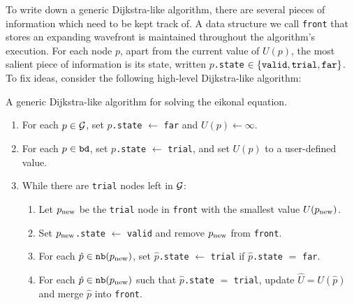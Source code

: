 \documentclass[smallcondensed]{svjour3}
\begin{document}
To write down a generic Dijkstra-like algorithm, there are several
pieces of information which need to be kept track of. A data structure
we call \texttt{front} that stores an expanding wavefront is
maintained throughout the algorithm's execution. For each node $p$,
apart from the current value of $U(p)$, the most salient piece of
information is its state, written $p$\texttt{.state}
$\in \left\{\texttt{valid}, \texttt{trial}, \texttt{far}\right\}$. To fix
ideas, consider the following high-level Dijkstra-like algorithm:

\begin{algorithm}
  \caption{A generic Dijkstra-like algorithm for solving the eikonal
    equation.}\label{alg:dijkstra-like}
  \begin{enumerate}[nolistsep]
  \item For each $p \in \mathcal{G}$, set $p$\texttt{.state} $\gets$
    \texttt{far} and $U(p) \gets \infty$.
  \item For each $p \in \texttt{bd}$, set $p$\texttt{.state} $\gets$
    \texttt{trial}, and set $U(p)$ to a user-defined value.
  \item While there are \texttt{trial} nodes left in $\mathcal{G}$:
    \begin{enumerate}[nolistsep]
    \item Let $p_{\operatorname{new}}$ be the \texttt{trial} node in \texttt{front}
      with the smallest value $U(p_{\operatorname{new}})$.\label{enum:get-node}
    \item Set $p_{\operatorname{new}}$\texttt{.state} $\gets$ \texttt{valid} and remove
      $p_{\operatorname{new}}$ from \texttt{front}.
    \item For each $\hat{p} \in \texttt{nb}(p_{\operatorname{new}})$, set
      $\hat{p}$\texttt{.state} $\gets$ \texttt{trial} if
      $\hat{p}$\texttt{.state} $=$ \texttt{far}.\label{enum:set-trial}
    \item For each $\hat{p} \in \texttt{nb}(p_{\operatorname{new}})$ such that
      $\hat{p}$\texttt{.state} $=$ \texttt{trial}, update
      $\hat{U} = U(\hat{p})$ and merge $\hat{p}$ into
      \texttt{front}.\label{enum:update-U}
    \end{enumerate}
  \end{enumerate}
\end{algorithm}
\end{document}
